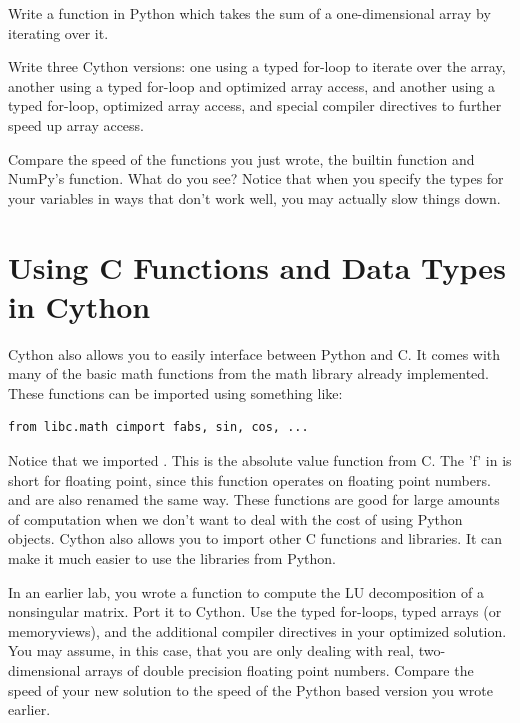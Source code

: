 \begin{problem}
Write a function in Python which takes the sum of a one-dimensional array by iterating over it.

Write three Cython versions: one using a typed for-loop to iterate over the array, another using a typed for-loop and optimized array access, and another using a typed for-loop, optimized array access, and special compiler directives to further speed up array access.

Compare the speed of the functions you just wrote, the builtin  function and NumPy's  function.
What do you see?
Notice that when you specify the types for your variables in ways that don't work well, you may actually slow things down.
\end{problem}

\section*{Using C Functions and Data Types in Cython}
Cython also allows you to easily interface between Python and C.
It comes with many of the basic math functions from the math library already implemented.
These functions can be imported using something like:
\begin{lstlisting}
from libc.math cimport fabs, sin, cos, ...
\end{lstlisting}
Notice that we imported .
This is the absolute value function from C.
The 'f' in  is short for floating point, since this function operates on floating point numbers.
 and  are also renamed the same way.
These functions are good for large amounts of computation when we don't want to deal with the cost of using Python objects.
Cython also allows you to import other C functions and libraries.
It can make it much easier to use the libraries from Python.

\begin{problem}
In an earlier lab, you wrote a function to compute the LU decomposition of a nonsingular matrix.
Port it to Cython.
Use the typed for-loops, typed arrays (or memoryviews), and the additional compiler directives in your optimized solution.
You may assume, in this case, that you are only dealing with real, two-dimensional arrays of double precision floating point numbers.
Compare the speed of your new solution to the speed of the Python based version you wrote earlier.
\end{problem}

